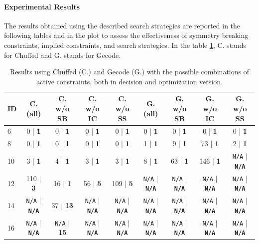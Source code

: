 \documentclass[11pt]{article}
\begin{document}
\paragraph{Experimental Results}

The results obtained using the described search strategies are reported in the following tables and in the plot to assess the effectiveness of symmetry breaking constraints, implied constraints, and search strategies. In the table \ref{tab:cp}, C. stands for Chuffed and G. stands for Gecode.

\begin{table}[H]
\small
\begin{tabular}{@{}lcccccccc@{}}
\toprule
ID & C. (all) & C. w/o SB & C. w/o IC & C. w/o SS & G. (all) & G. w/o SB & G. w/o IC & G. w/o SS \\
\midrule
6 & 0 | \textbf{1} & 0 | \textbf{1} & 0 | \textbf{1} & 0 | \textbf{1} & 0 | \textbf{1} & 0 | \textbf{1} & 0 | \textbf{1} & 0 | \textbf{1}\\
8 & 0 | \textbf{1} & 0 | \textbf{1} & 0 | \textbf{1} & 0 | \textbf{1} & 1 | \textbf{1} & 9 | \textbf{1} & 73 | \textbf{1} & 2 | \textbf{1}\\
10 & 3 | \textbf{1} & 4 | \textbf{1} & 3 | \textbf{1} & 3 | \textbf{1} & 8 | \textbf{1} & 63 | \textbf{1} & 146 | \textbf{1} & \texttt{N/A} | \textbf{\texttt{N/A}}\\
12 & 110 | \textbf{3} & 16 | \textbf{1} & 56 | \textbf{5} & 109 | \textbf{5} & \texttt{N/A} | \textbf{\texttt{N/A}} & \texttt{N/A} | \textbf{\texttt{N/A}} & \texttt{N/A} | \textbf{\texttt{N/A}} & \texttt{N/A} | \textbf{\texttt{N/A}}\\
14 & \texttt{N/A} | \textbf{\texttt{N/A}} & 37 | \textbf{13} & \texttt{N/A} | \textbf{\texttt{N/A}} & \texttt{N/A} | \textbf{\texttt{N/A}} & \texttt{N/A} | \textbf{\texttt{N/A}} & \texttt{N/A} | \textbf{\texttt{N/A}} & \texttt{N/A} | \textbf{\texttt{N/A}} & \texttt{N/A} | \textbf{\texttt{N/A}}\\
16 & \texttt{N/A} | \textbf{\texttt{N/A}} & \texttt{N/A} | \textbf{15} & \texttt{N/A} | \textbf{\texttt{N/A}} & \texttt{N/A} | \textbf{\texttt{N/A}} & \texttt{N/A} | \textbf{\texttt{N/A}} & \texttt{N/A} | \textbf{\texttt{N/A}} & \texttt{N/A} | \textbf{\texttt{N/A}} & \texttt{N/A} | \textbf{\texttt{N/A}}\\
\bottomrule
\end{tabular}
\caption{Results using Chuffed (C.) and Gecode (G.) with the possible combinations of active constraints, both in decision and optimization version.}
\label{tab:cp}
\end{table}
\end{document}
